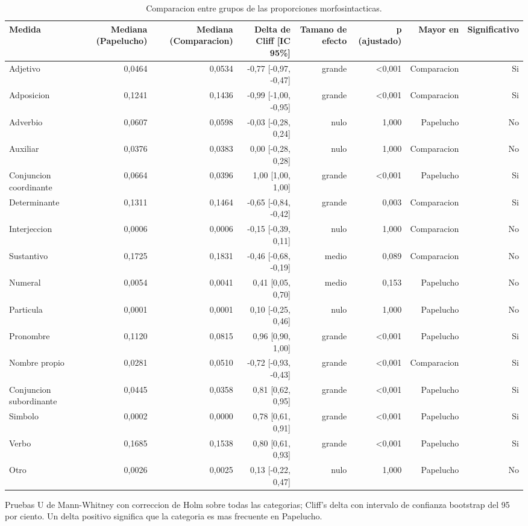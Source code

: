 \begin{table}[htbp]
\centering
\small
\caption{Comparacion entre grupos de las proporciones morfosintacticas.}
\label{tab:pos-results-es}
\begin{tabular}{lrrrrrrr}
\toprule
\textbf{Medida} & \textbf{Mediana (Papelucho)} & \textbf{Mediana (Comparacion)} & \textbf{Delta de Cliff [IC 95\%]} & \textbf{Tamano de efecto} & \textbf{p (ajustado)} & \textbf{Mayor en} & \textbf{Significativo} \\
\midrule
Adjetivo & 0,0464 & 0,0534 & -0,77 [-0,97, -0,47] & grande & <0,001 & Comparacion & Si \\
Adposicion & 0,1241 & 0,1436 & -0,99 [-1,00, -0,95] & grande & <0,001 & Comparacion & Si \\
Adverbio & 0,0607 & 0,0598 & -0,03 [-0,28, 0,24] & nulo & 1,000 & Papelucho & No \\
Auxiliar & 0,0376 & 0,0383 & 0,00 [-0,28, 0,28] & nulo & 1,000 & Comparacion & No \\
Conjuncion coordinante & 0,0664 & 0,0396 & 1,00 [1,00, 1,00] & grande & <0,001 & Papelucho & Si \\
Determinante & 0,1311 & 0,1464 & -0,65 [-0,84, -0,42] & grande & 0,003 & Comparacion & Si \\
Interjeccion & 0,0006 & 0,0006 & -0,15 [-0,39, 0,11] & nulo & 1,000 & Comparacion & No \\
Sustantivo & 0,1725 & 0,1831 & -0,46 [-0,68, -0,19] & medio & 0,089 & Comparacion & No \\
Numeral & 0,0054 & 0,0041 & 0,41 [0,05, 0,70] & medio & 0,153 & Papelucho & No \\
Particula & 0,0001 & 0,0001 & 0,10 [-0,25, 0,46] & nulo & 1,000 & Papelucho & No \\
Pronombre & 0,1120 & 0,0815 & 0,96 [0,90, 1,00] & grande & <0,001 & Papelucho & Si \\
Nombre propio & 0,0281 & 0,0510 & -0,72 [-0,93, -0,43] & grande & <0,001 & Comparacion & Si \\
Conjuncion subordinante & 0,0445 & 0,0358 & 0,81 [0,62, 0,95] & grande & <0,001 & Papelucho & Si \\
Simbolo & 0,0002 & 0,0000 & 0,78 [0,61, 0,91] & grande & <0,001 & Papelucho & Si \\
Verbo & 0,1685 & 0,1538 & 0,80 [0,61, 0,93] & grande & <0,001 & Papelucho & Si \\
Otro & 0,0026 & 0,0025 & 0,13 [-0,22, 0,47] & nulo & 1,000 & Papelucho & No \\
\bottomrule
\end{tabular}
\vspace{0.5em}
\begin{minipage}{\linewidth}\footnotesize Pruebas U de Mann-Whitney con correccion de Holm sobre todas las categorias; Cliff's delta con intervalo de confianza bootstrap del 95 por ciento. Un delta positivo significa que la categoria es mas frecuente en Papelucho.\end{minipage}
\end{table}

